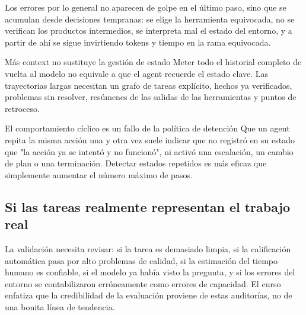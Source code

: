 \documentclass[a4paper]{article}
\begin{document}

Los errores por lo general no aparecen de golpe en el último paso, sino que se acumulan desde decisiones tempranas: se elige la herramienta equivocada, no se verifican los productos intermedios, se interpreta mal el estado del entorno, y a partir de ahí se sigue invirtiendo tokens y tiempo en la rama equivocada.

\begin{warningbox}{Más context no sustituye la gestión de estado}
Meter todo el historial completo de vuelta al modelo no equivale a que el agent recuerde el estado clave. Las trayectorias largas necesitan un grafo de tareas explícito, hechos ya verificados, problemas sin resolver, resúmenes de las salidas de las herramientas y puntos de retroceso.
\end{warningbox}

\begin{knowledgebox}{El comportamiento cíclico es un fallo de la política de detención}
Que un agent repita la misma acción una y otra vez suele indicar que no registró en su estado que "la acción ya se intentó y no funcionó", ni activó una escalación, un cambio de plan o una terminación. Detectar estados repetidos es más eficaz que simplemente aumentar el número máximo de pasos.
\end{knowledgebox}

\subsection{Si las tareas realmente representan el trabajo real}


La validación necesita revisar: si la tarea es demasiado limpia, si la calificación automática pasa por alto problemas de calidad, si la estimación del tiempo humano es confiable, si el modelo ya había visto la pregunta, y si los errores del entorno se contabilizaron erróneamente como errores de capacidad. El curso enfatiza que la credibilidad de la evaluación proviene de estas auditorías, no de una bonita línea de tendencia.
\end{document}
